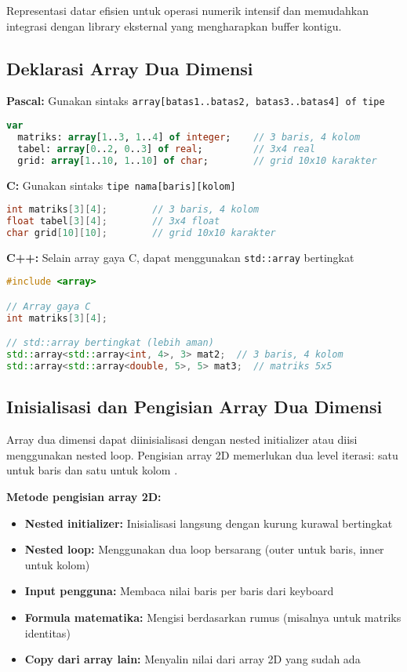 \documentclass[../main.tex]{subfiles}
\begin{document}
Representasi datar efisien untuk operasi numerik intensif dan memudahkan integrasi dengan library eksternal yang mengharapkan buffer kontigu.

\subsection{Deklarasi Array Dua Dimensi}

\textbf{Pascal:} Gunakan sintaks \texttt{array[batas1..batas2, batas3..batas4] of tipe}
\begin{lstlisting}[language=Pascal, caption={Deklarasi array 2D di Pascal}]
var
  matriks: array[1..3, 1..4] of integer;    // 3 baris, 4 kolom
  tabel: array[0..2, 0..3] of real;         // 3x4 real
  grid: array[1..10, 1..10] of char;        // grid 10x10 karakter
\end{lstlisting}

\textbf{C:} Gunakan sintaks \texttt{tipe nama[baris][kolom]}
\begin{lstlisting}[language=C, caption={Deklarasi array 2D di C}]
int matriks[3][4];        // 3 baris, 4 kolom
float tabel[3][4];        // 3x4 float
char grid[10][10];        // grid 10x10 karakter
\end{lstlisting}

\textbf{C++:} Selain array gaya C, dapat menggunakan \texttt{std::array} bertingkat
\begin{lstlisting}[language=C++, caption={Deklarasi array 2D di C++}]
#include <array>

// Array gaya C
int matriks[3][4];

// std::array bertingkat (lebih aman)
std::array<std::array<int, 4>, 3> mat2;  // 3 baris, 4 kolom
std::array<std::array<double, 5>, 5> mat3;  // matriks 5x5
\end{lstlisting}

\subsection{Inisialisasi dan Pengisian Array Dua Dimensi}

Array dua dimensi dapat diinisialisasi dengan nested initializer atau diisi menggunakan nested loop. Pengisian array 2D memerlukan dua level iterasi: satu untuk baris dan satu untuk kolom \parencite{geeksforgeeks-2d-array,learncpp-multidimensional,duniailkom-cpp-2d-array}.

\textbf{Metode pengisian array 2D:}
\begin{itemize}
  \item \textbf{Nested initializer:} Inisialisasi langsung dengan kurung kurawal bertingkat
  \item \textbf{Nested loop:} Menggunakan dua loop bersarang (outer untuk baris, inner untuk kolom)
  \item \textbf{Input pengguna:} Membaca nilai baris per baris dari keyboard
  \item \textbf{Formula matematika:} Mengisi berdasarkan rumus (misalnya untuk matriks identitas)
  \item \textbf{Copy dari array lain:} Menyalin nilai dari array 2D yang sudah ada
\end{itemize}
\end{document}
